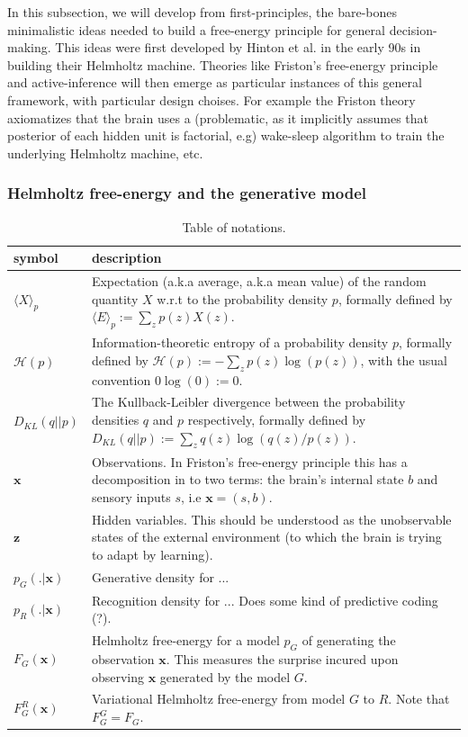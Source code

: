 \documentclass{article} %
\def\z{\mathbf{z}}
\def\x{\mathbf{x}}
\begin{document}
In this subsection, we will develop from first-principles, the bare-bones minimalistic ideas needed to build a free-energy principle for general decision-making. This ideas were first developed by Hinton et al. in the early 90s in building their Helmholtz machine. Theories like Friston's free-energy principle and active-inference will then emerge as particular instances of this general framework, with particular design choises. For example the Friston theory axiomatizes that the brain uses a (problematic, as it implicitly assumes that posterior of each hidden unit is factorial, e.g) wake-sleep algorithm to train the underlying Helmholtz machine, etc.

\subsubsection{Helmholtz free-energy and the generative model}
\begin{table}[H]
  \begin{tabular}{p{2cm}|p{11cm}}
         \hline
         \textbf{symbol}    & \textbf{description}  \\ \hline
         $\langle X\rangle_p$ & Expectation (a.k.a average, a.k.a mean value) of the
         random quantity $X$ w.r.t to the probability density $p$, formally defined by $\langle E\rangle_p := \sum_{z}p(z)X(z)$.\\ \hline
         $\mathcal H(p)$ & Information-theoretic entropy of a probability density $p$, formally defined by $\mathcal H(p) := -\sum_{z}p(z)\log(p(z))$,
          with the usual convention $0 \log(0) := 0$.\\ \hline
         $D_{KL}(q||p)$ & The Kullback-Leibler divergence between the probability densities $q$ and $p$ respectively, formally defined by $D_{KL}(q||p) := \sum_{z}q(z)\log(q(z)/p(z))$.\\ \hline
             $\x$ & Observations. In Friston's free-energy principle this has a decomposition in to two terms: the brain's internal state $b$ and sensory inputs $s$, i.e $\x = (s, b).$ \\ \hline
             $\z$ & Hidden variables. This should be understood as the unobservable states of the external environment (to which the brain is trying to adapt by learning).\\ \hline
             $p_G(.|\x)$ & Generative density for ...\\ \hline
         $p_R(.|\x)$ & Recognition density for ... Does some kind of predictive coding (?).\\ \hline
         $F_G(\x)$ & Helmholtz free-energy for a model $p_G$ of generating the observation $\x$. This measures the surprise incured upon observing $\x$ generated by the model $G$.\\ \hline
         $F^R_G(\x)$ & Variational Helmholtz free-energy from model $G$
          to $R$.  Note that $F^G_G = F_G$.\\ \hline
  \end{tabular}
  \caption{Table of notations.}
\end{table}
\end{document}
